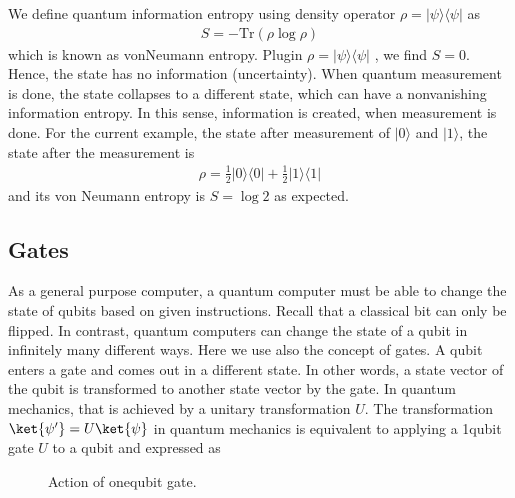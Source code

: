 \documentclass[letterpaper,10pt,english]{jupyterBook}
\begin{document}
\sphinxAtStartPar
We define quantum information entropy using density operator \(\rho = \lvert \psi \rangle \langle \psi \rvert\) as
\begin{equation*}
\begin{split}
S = - \text{Tr} \left(\rho \log \rho\right)
\end{split}
\end{equation*}
\sphinxAtStartPar
which is known as von\sphinxhyphen{}Neumann entropy. Plugin \(\rho = \lvert \psi \rangle \langle \psi \rvert\) , we find \(S=0\).  Hence, the state has no information (uncertainty).  When quantum measurement is done, the state collapses to a different state, which can have a non\sphinxhyphen{}vanishing information entropy.  In this sense, information is created, when measurement is done.  For the current example, the state after measurement of \(\lvert 0 \rangle\) and \(\lvert 1 \rangle\), the state after the measurement is
\begin{equation*}
\begin{split}
\rho = \frac{1}{2}  \lvert 0 \rangle \langle 0 \rvert + \frac{1}{2}  \lvert 1 \rangle \langle 1 \rvert
\end{split}
\end{equation*}
\sphinxAtStartPar
and its von Neumann entropy is \(S = \log 2\) as expected.


\subsection{Gates}
\label{\detokenize{computation/qcomp:gates}}
\sphinxAtStartPar
As a general purpose computer, a quantum computer must be able to change the state of qubits based on given instructions. Recall that a classical bit can only be flipped.  In contrast, quantum computers can change the state of a qubit in infinitely many different ways.  Here we use also the concept of gates.  A qubit enters a gate and comes out in a different state.  In other words, a state vector of the qubit is transformed to another state vector by the gate.  In quantum mechanics, that is achieved by a unitary transformation \(U\).   The transformation \(\ket{\psi'}=U \ket{\psi}\) in quantum mechanics is equivalent to applying a 1\sphinxhyphen{}qubit gate \(U\) to a qubit and expressed as

\begin{figure}[htbp]
\centering
\capstart

\noindent{}
\caption{Action of one\sphinxhyphen{}qubit gate.}\label{\detokenize{computation/qcomp:u1-gate}}\end{figure}
\end{document}
